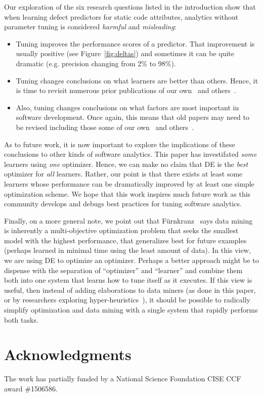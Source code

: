 \documentclass{sig-alternative}
\newcommand{\bi}{\begin{itemize}[leftmargin=0.4cm]}
\newcommand{\ei}{\end{itemize}}
\newcommand{\fig}[1]{Figure~\ref{fig:#1}}
\begin{document}
Our exploration of the six research
questions listed in the introduction
show that when learning defect predictors for static code
attributes,   analytics without parameter tuning is considered {\em harmful} and {\em misleading}:
\bi
\item Tuning improves the performance scores of a predictor.
That improvement is usually positive (see \fig{deltas}) and sometimes
it can be quite   dramatic (e.g. precision changing from 2\% to 98\%). \item 
Tuning changes conclusions on what learners are better than others.
Hence, it is time to revisit numerous prior publications of our own~\cite{me07b}
and others~\cite{lessmann2008benchmarking,hall11}.
\item
Also,
tuning changes conclusions on what factors are most important in software development.
Once again, this means that old papers may need to be revised including those
some of our own~\cite{me02k} and others~\cite{bell2013limited,rahman2013how,Moser:2008,zimmermann2007predicting,herzig2013predicting}. 
\ei
As to future work, it is now important
to explore the implications of these
conclusions to other kinds of software analytics.
 This paper has investifated  {\em some} learners using {\em one}  optimizer. Hence, we can make
no claim that DE is the {\em best} optimizer for {\em all} learners.
Rather, our point is that there exists at least some learners
whose performance can be dramatically improved by 
at least one simple optimization scheme.  We hope that this work inspires
much future work as this community develops and debugs best practices for tuning
software analytics.

Finally, on a more general note, we point out
that 
F\"{u}rnkranz~\cite{furnkranz05} says data mining is inherently a multi-objective optimization
problem that seeks the smallest model with the highest performance, 
that generalizes best for
future examples (perhaps learned in minimal time using the least amount of data).
In this view, we are using DE to optimize an optimizer. Perhaps a better approach might be
to dispense with the separation of ``optimizer'' and ``learner'' and combine them both
into one system that learns how to tune itself as it executes. If this view is useful,
then instead of adding elaborations to data miners (as done in this paper, or by researchers
exploring hyper-heuristics~\cite{jia2013learning}), it should be possible to radically simplify optimization and data
mining with a single system that rapidly performs both tasks.


 
 

\section*{Acknowledgments}
The work has partially funded by a National Science Foundation CISE CCF award \#1506586.
 
\vspace*{0.5mm}
 
 


\balance
  

   



  


  
\end{document}
